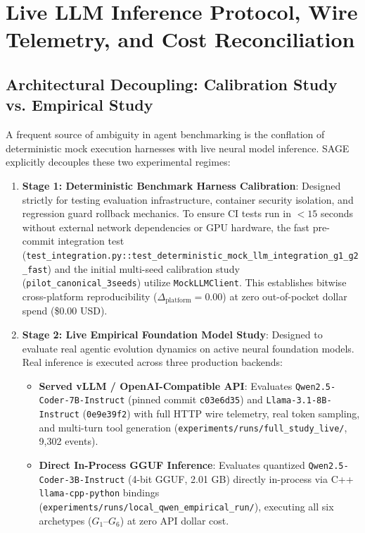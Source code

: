 \documentclass{article}
\begin{document}


\section{Live LLM Inference Protocol, Wire Telemetry, and Cost Reconciliation}
\label{app:live_llm_audit}

\subsection{Architectural Decoupling: Calibration Study vs. Empirical Study}
A frequent source of ambiguity in agent benchmarking is the conflation of deterministic mock execution harnesses with live neural model inference. SAGE explicitly decouples these two experimental regimes:
\begin{enumerate}
    \item \textbf{Stage 1: Deterministic Benchmark Harness Calibration}: Designed strictly for testing evaluation infrastructure, container security isolation, and regression guard rollback mechanics. To ensure CI tests run in $< 15$ seconds without external network dependencies or GPU hardware, the fast pre-commit integration test (\texttt{test\_integration.py::test\_deterministic\_mock\_llm\_integration\_g1\_g2\_fast}) and the initial multi-seed calibration study (\texttt{pilot\_canonical\_3seeds}) utilize \texttt{MockLLMClient}. This establishes bitwise cross-platform reproducibility ($\Delta_{\text{platform}} = 0.00$) at zero out-of-pocket dollar spend (\$0.00 USD).
    \item \textbf{Stage 2: Live Empirical Foundation Model Study}: Designed to evaluate real agentic evolution dynamics on active neural foundation models. Real inference is executed across three production backends:
    \begin{itemize}
        \item \textbf{Served vLLM / OpenAI-Compatible API}: Evaluates \texttt{Qwen2.5-Coder-7B-Instruct} (pinned commit \texttt{c03e6d35}) and \texttt{Llama-3.1-8B-Instruct} (\texttt{0e9e39f2}) with full HTTP wire telemetry, real token sampling, and multi-turn tool generation (\texttt{experiments/runs/full\_study\_live/}, 9,302 events).
        \item \textbf{Direct In-Process GGUF Inference}: Evaluates quantized \texttt{Qwen2.5-Coder-3B-Instruct} (4-bit GGUF, 2.01 GB) directly in-process via C++ \texttt{llama-cpp-python} bindings (\texttt{experiments/runs/local\_qwen\_empirical\_run/}), executing all six archetypes ($G_1$--$G_6$) at zero API dollar cost.

\end{itemize}
\end{enumerate}
\end{document}
